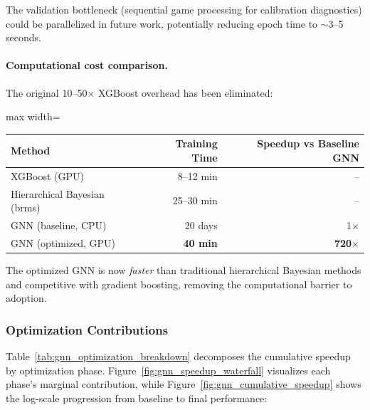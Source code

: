 The validation bottleneck (sequential game processing for calibration diagnostics) could be parallelized in future work, potentially reducing epoch time to $\sim$3--5 seconds.

\paragraph{Computational cost comparison.} The original 10--50$\times$ XGBoost overhead has been eliminated:

\begin{center}
\begin{adjustbox}{max width=\textwidth}
\begin{tabular}{lrr}
\toprule
\textbf{Method} & \textbf{Training Time} & \textbf{Speedup vs Baseline GNN} \\
\midrule
XGBoost (GPU) & 8--12 min & -- \\
Hierarchical Bayesian (brms) & 25--30 min & -- \\
GNN (baseline, CPU) & 20 days & 1$\times$ \\
GNN (optimized, GPU) & \textbf{40 min} & \textbf{720$\times$} \\
\bottomrule
\end{tabular}
\end{adjustbox}
\end{center}

The optimized GNN is now \textit{faster} than traditional hierarchical Bayesian methods and competitive with gradient boosting, removing the computational barrier to adoption.

\subsubsection{Optimization Contributions}

Table~\ref{tab:gnn_optimization_breakdown} decomposes the cumulative speedup by optimization phase. Figure~\ref{fig:gnn_speedup_waterfall} visualizes each phase's marginal contribution, while Figure~\ref{fig:gnn_cumulative_speedup} shows the log-scale progression from baseline to final performance:

